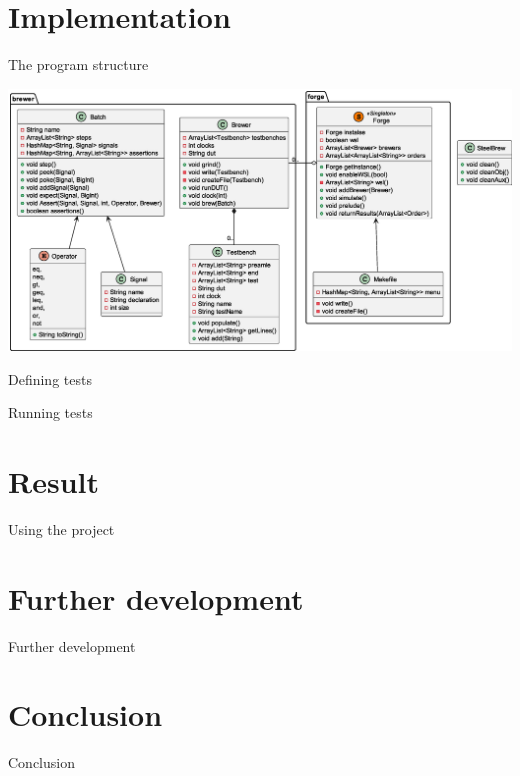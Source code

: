 \documentclass[aspectratio=169, handout]{beamer}
\begin{document}
\section{Implementation}
\begin{frame}{The program structure}
    \begin{center}
        \includegraphics[height=.8\textheight]{out/plantuml/classDiag/classDiag.eps}
    \end{center}
\end{frame}
\begin{frame}{Defining tests}
    
\end{frame}
\begin{frame}{Running tests}
    
\end{frame}
\section{Result}
\begin{frame}{Using the project}

\end{frame}
\section{Further development}
\begin{frame}{Further development}

\end{frame}
\section{Conclusion}
\begin{frame}{Conclusion}

\end{frame}
\end{document}
